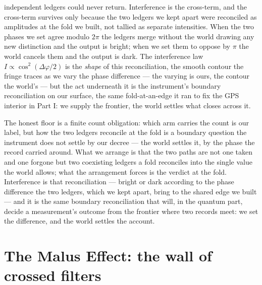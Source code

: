 independent ledgers could never return. Interference is the cross-term, and the cross-term survives only
because the two ledgers we kept apart were reconciled as amplitudes at the fold we built, not tallied as
separate intensities. When the two phases we set agree modulo $2\pi$ the ledgers merge without the world
drawing any new distinction and the output is bright; when we set them to oppose by $\pi$ the world cancels
them and the output is dark. The interference law $I \propto
\cos^2(\Delta\varphi/2)$ is the \emph{shape} of this reconciliation, the smooth contour the fringe traces as we
vary the phase difference --- the varying is ours, the contour the world's --- but the act underneath it is the
instrument's boundary reconciliation on our surface, the same fold-at-an-edge it ran to fix the GPS interior in
Part I: we supply the frontier, the world settles what closes across it.

The honest floor is a finite count obligation: which arm carries the count is our label, but how the two
ledgers reconcile at the fold is a boundary question the instrument does not settle by our decree --- the world
settles it, by the phase the record carried around. What we arrange is that the two paths are not one taken and
one forgone but two coexisting ledgers a fold reconciles into the single value the world allows; what the
arrangement forces is the verdict at the fold. Interference is that reconciliation --- bright or dark according
to the phase difference the two ledgers, which we kept apart, bring to the shared edge we built --- and it is
the same boundary reconciliation that will, in the quantum part, decide a measurement's outcome from the
frontier where two records meet: we set the difference, and the world settles the account.

\section{The Malus Effect: the wall of crossed filters}
\label{se:malus}

